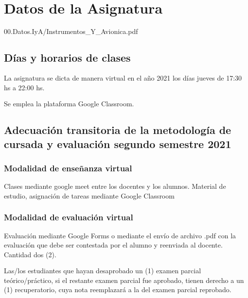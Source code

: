 %

\chapter*{Datos de la Asignatura}
\label{chap:00.datos.de.IyA}

  
  {00.Datos.IyA/Instrumentos_Y_Avionica.pdf}


\section{Días y horarios de clases}
\label{sec:dias+horarios.clases}

La asignatura se dicta de manera virtual en el año 2021
los días jueves de 17:30 hs a 22:00 hs.

Se emplea la plataforma Google Classroom.%



\section*{Adecuación transitoria de la metodología de cursada  y evaluación segundo semestre 2021}
\label{00.Adecuacion.transitoria}


\subsection*{Modalidad de enseñanza virtual} 
Clases mediante google meet entre los docentes y los alumnos.
Material de estudio, asignación de tareas mediante Google Classroom
\subsection*{Modalidad de evaluación virtual}
Evaluación mediante Google Forms o mediante el envío de archivo .pdf con la evaluación que debe ser contestada por el alumno y reenviada al docente. Cantidad dos (2).

Las/los estudiantes que hayan desaprobado un (1) examen parcial teórico/práctico, si el restante examen parcial fue aprobado, tienen derecho a un (1) recuperatorio, cuya nota reemplazará a la del examen parcial reprobado.

